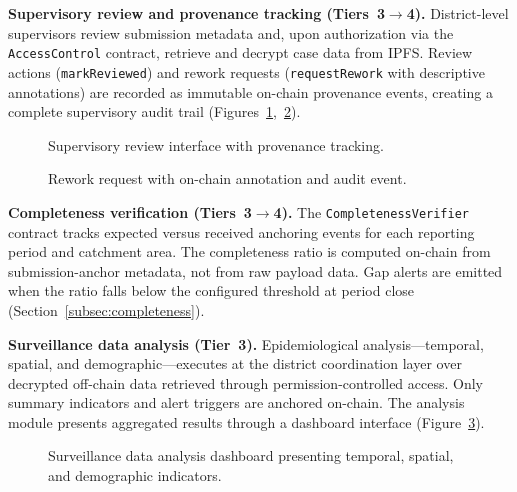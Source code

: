 \documentclass[AMA,LATO1COL]{WileyNJD-v2}
\begin{document}
\textbf{Supervisory review and provenance tracking (Tiers~3$\rightarrow$4).} District-level supervisors review submission metadata and, upon authorization via the \texttt{AccessControl} contract, retrieve and decrypt case data from IPFS. Review actions (\texttt{markReviewed}) and rework requests (\texttt{requestRework} with descriptive annotations) are recorded as immutable on-chain provenance events, creating a complete supervisory audit trail (Figures~\ref{fig:review},~\ref{fig:feedback}).

\begin{figure}[!ht]
\centering
{}
\caption{Supervisory review interface with provenance tracking.}\label{fig:review}
\end{figure}

\begin{figure}[!ht]
\centering
{}
\caption{Rework request with on-chain annotation and audit event.}\label{fig:feedback}
\end{figure}

\textbf{Completeness verification (Tiers~3$\rightarrow$4).} The \texttt{CompletenessVerifier} contract tracks expected versus received anchoring events for each reporting period and catchment area. The completeness ratio is computed on-chain from submission-anchor metadata, not from raw payload data. Gap alerts are emitted when the ratio falls below the configured threshold at period close (Section~\ref{subsec:completeness}).

\textbf{Surveillance data analysis (Tier~3).} Epidemiological analysis---temporal, spatial, and demographic---executes at the district coordination layer over decrypted off-chain data retrieved through permission-controlled access. Only summary indicators and alert triggers are anchored on-chain. The analysis module presents aggregated results through a dashboard interface (Figure~\ref{fig:analysis}).

\begin{figure}[!ht]
\centering
{}
\caption{Surveillance data analysis dashboard presenting temporal, spatial, and demographic indicators.}\label{fig:analysis}
\end{figure}
\end{document}
